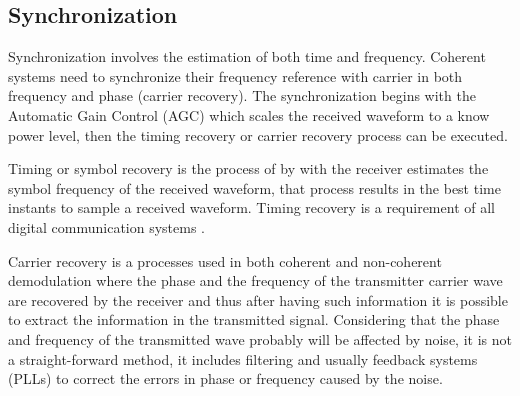 \subsection{Synchronization}

Synchronization involves the estimation of both time and frequency. Coherent
systems need to synchronize their frequency reference with carrier in both
frequency and phase (carrier recovery). The synchronization begins with the
Automatic Gain Control (AGC) which scales the received waveform to a know power
level, then the timing recovery or carrier recovery process can be executed.

Timing or symbol recovery is the process of by with the receiver estimates the
symbol frequency of the received waveform, that process results in the best time
instants to sample a received waveform. Timing recovery is a requirement of all
digital communication systems \cite{akbook}.

Carrier recovery is a processes used in both coherent and non-coherent
demodulation where the phase and the frequency of the transmitter carrier wave
are recovered by the receiver and thus after having such information it is
possible to extract the information in the transmitted signal. Considering that
the phase and frequency of the transmitted wave probably will be affected by
noise, it is not a straight-forward method, it includes filtering and usually
feedback systems (PLLs) to correct the errors in phase or frequency caused by
the noise.
